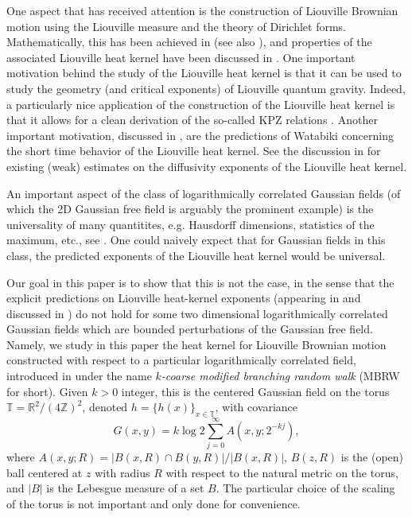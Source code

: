 \documentclass[11pt]{article}
\theoremstyle{definition}
\def \R {{\mathbb{R}}}
\def \T {{\mathbb{T}}}
\def \Z {{\mathbb{Z}}}
\begin{document}
One aspect that has received attention is the construction of Liouville
Brownian motion using the Liouville measure and the theory of Dirichlet forms.
Mathematically, this has been achieved in \cite{GRV13}
(see also \cite{Ber15}), and properties
of the associated Liouville heat kernel have been discussed in \cite{GRV14,
MRVZ14, AK16}.
One important motivation behind the study of the Liouville heat kernel is that it
can be used to study the geometry (and critical exponents) of
Liouville quantum gravity. Indeed,
a particularly nice application of the construction
of the Liouville heat kernel is that it allows for a clean derivation
of the so-called KPZ relations \cite{BGRV16}.
Another  important motivation, discussed
in \cite{MRVZ14}, are the predictions of Watabiki \cite{Wa} concerning
the short time behavior of the Liouville heat kernel. See the
discussion in \cite{MRVZ14, AK16} for existing (weak)
estimates on the diffusivity exponents of the Liouville heat kernel.

An important aspect of the class of logarithmically correlated Gaussian
fields (of which the 2D Gaussian free field is arguably the prominent example)
is the universality of many quantitites,
e.g. Hausdorff dimensions, statistics of the maximum, etc.,
see \cite{RV14,DRZ15}. One could naively expect that for Gaussian fields
in this class, the  predicted exponents of the Liouville heat kernel
would be universal.

Our goal in this paper is to show that this is not the case, in the sense that
the explicit predictions on Liouville heat-kernel exponents (appearing in
\cite{Wa} and discussed in \cite{MRVZ14, AK16}) do not hold for
some two dimensional logarithmically
correlated Gaussian fields which are bounded perturbations of the Gaussian free field.
Namely,
we study in this paper the heat kernel for Liouville Brownian motion
constructed with respect to a particular logarithmically
correlated field, introduced in \cite{DZ15}
under the name \textit{$k$-coarse modified branching random walk} (MBRW for short). Given $k>0$ integer,
this is the centered Gaussian field
on the torus $\T = \R^2/(4\Z)^2$, denoted $h=\{h (x) \}_{x\in \T}$,
  with covariance
 $$
G(x,y) = k \log 2 \sum_{j=0}^\infty A (x,y; 2^{-kj} ),
 $$
where $A(x, y; R) = | B(x, R) \cap B(y, R)| / |B(x,R)|$,
$B(z,R)$ is the (open) ball centered at $z$ with radius $R$ with respect to the
natural metric on the torus, and $| B |$ is the Lebesgue measure of a set $B$. The particular choice of the
scaling of the torus is not important and only done for convenience.
\end{document}
